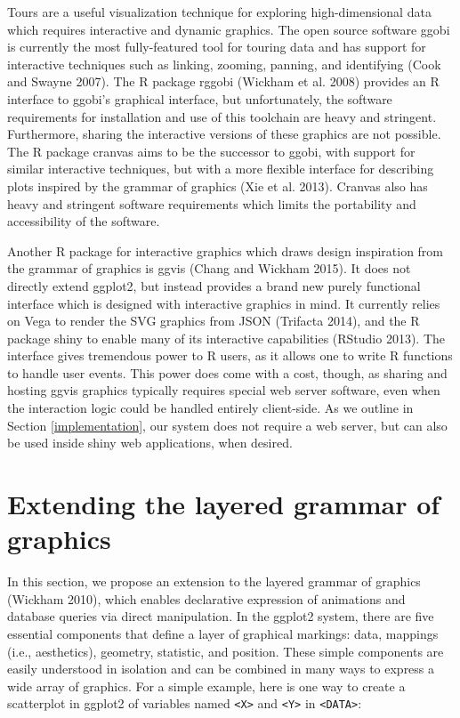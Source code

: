 \documentclass[12pt,]{article}
\theoremstyle{definition}
\theoremstyle{definition}
\theoremstyle{remark}
\begin{document}
Tours are a useful visualization technique for exploring
high-dimensional data which requires interactive and dynamic graphics.
The open source software ggobi is currently the most fully-featured tool
for touring data and has support for interactive techniques such as
linking, zooming, panning, and identifying (Cook and Swayne 2007). The R
package rggobi (Wickham et al. 2008) provides an R interface to ggobi's
graphical interface, but unfortunately, the software requirements for
installation and use of this toolchain are heavy and stringent.
Furthermore, sharing the interactive versions of these graphics are not
possible. The R package cranvas aims to be the successor to ggobi, with
support for similar interactive techniques, but with a more flexible
interface for describing plots inspired by the grammar of graphics (Xie
et al. 2013). Cranvas also has heavy and stringent software requirements
which limits the portability and accessibility of the software.

Another R package for interactive graphics which draws design
inspiration from the grammar of graphics is ggvis (Chang and Wickham
2015). It does not directly extend ggplot2, but instead provides a brand
new purely functional interface which is designed with interactive
graphics in mind. It currently relies on Vega to render the SVG graphics
from JSON (Trifacta 2014), and the R package shiny to enable many of its
interactive capabilities (RStudio 2013). The interface gives tremendous
power to R users, as it allows one to write R functions to handle user
events. This power does come with a cost, though, as sharing and hosting
ggvis graphics typically requires special web server software, even when
the interaction logic could be handled entirely client-side. As we
outline in Section \ref{implementation}, our system does not require a
web server, but can also be used inside shiny web applications, when
desired.

\section{Extending the layered grammar of
graphics}\label{extending-the-layered-grammar-of-graphics}

In this section, we propose an extension to the layered grammar of
graphics (Wickham 2010), which enables declarative expression of
animations and database queries via direct manipulation. In the ggplot2
system, there are five essential components that define a layer of
graphical markings: data, mappings (i.e., aesthetics), geometry,
statistic, and position. These simple components are easily understood
in isolation and can be combined in many ways to express a wide array of
graphics. For a simple example, here is one way to create a scatterplot
in ggplot2 of variables named \texttt{\textless{}X\textgreater{}} and
\texttt{\textless{}Y\textgreater{}} in
\texttt{\textless{}DATA\textgreater{}}:
\end{document}
